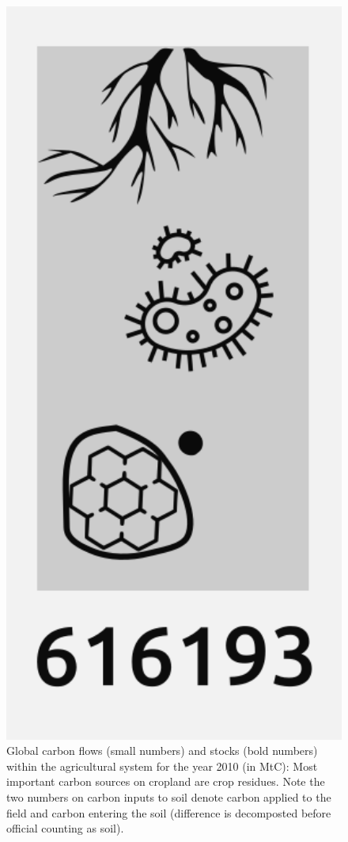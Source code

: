 \documentclass[gc, manuscript]{copernicus}
\begin{document}
\begin{figure}[H]
\includegraphics[width=16cm]{../ResultNotebooks/Output/Images/OuFlowFig} \caption{Global carbon flows (small numbers) and stocks (bold numbers) within the agricultural system for the year 2010 (in MtC): Most important carbon sources on cropland are crop residues. Note the two numbers on carbon inputs to soil denote carbon applied to the field and carbon entering the soil (difference is decomposted before official counting as soil).}\label{fig:FlowFig}
\end{figure}
\end{document}
